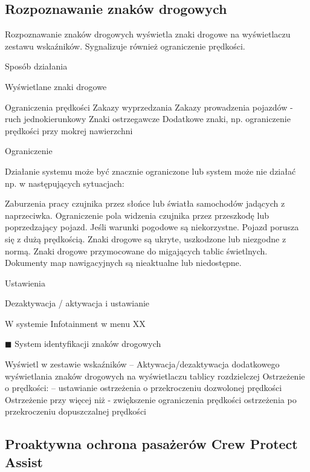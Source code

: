 \subsection{Rozpoznawanie znaków drogowych}

Rozpoznawanie znaków drogowych wyświetla znaki drogowe na wyświetlaczu zestawu wskaźników.
Sygnalizuje również ograniczenie prędkości.

Sposób działania

Wyświetlane znaki drogowe
\begin{itemizeTriangle}
	\itemTriangle Ograniczenia prędkości
	\itemTriangle Zakazy wyprzedzania
	\itemTriangle Zakazy prowadzenia pojazdów - ruch jednokierunkowy
	\itemTriangle Znaki ostrzegawcze
	\itemTriangle Dodatkowe znaki, np. ograniczenie prędkości przy mokrej nawierzchni
\end{itemizeTriangle}

Ograniczenie

Działanie systemu może być znacznie ograniczone lub system może nie działać np. w następujących sytuacjach:
\begin{itemizeTriangle}
	\itemTriangle Zaburzenia pracy czujnika przez słońce lub światła samochodów jadących z naprzeciwka.
	\itemTriangle Ograniczenie pola widzenia czujnika przez przeszkodę lub poprzedzający pojazd.
	\itemTriangle Jeśli warunki pogodowe są niekorzystne.
	\itemTriangle Pojazd porusza się z dużą prędkością.
	\itemTriangle Znaki drogowe są ukryte, uszkodzone lub niezgodne z normą.
	\itemTriangle Znaki drogowe przymocowane do migających tablic świetlnych.
	\itemTriangle Dokumenty map nawigacyjnych są nieaktualne lub niedostępne.
\end{itemizeTriangle}

Ustawienia

Dezaktywacja / aktywacja i ustawianie

W systemie Infotainment w menu XX

◼ System identyfikacji znaków drogowych
\begin{itemizeTriangle}
	\itemTriangle Wyświetl w zestawie wskaźników – Aktywacja/dezaktywacja dodatkowego wyświetlania znaków drogowych na wyświetlaczu tablicy rozdzielczej
	\itemTriangle Ostrzeżenie o prędkości: – ustawianie ostrzeżenia o przekroczeniu dozwolonej prędkości
	\itemTriangle Ostrzeżenie przy więcej niż - zwiększenie ograniczenia prędkości ostrzeżenia po przekroczeniu dopuszczalnej prędkości
\end{itemizeTriangle}

\subsection{Proaktywna ochrona pasażerów Crew Protect Assist}

